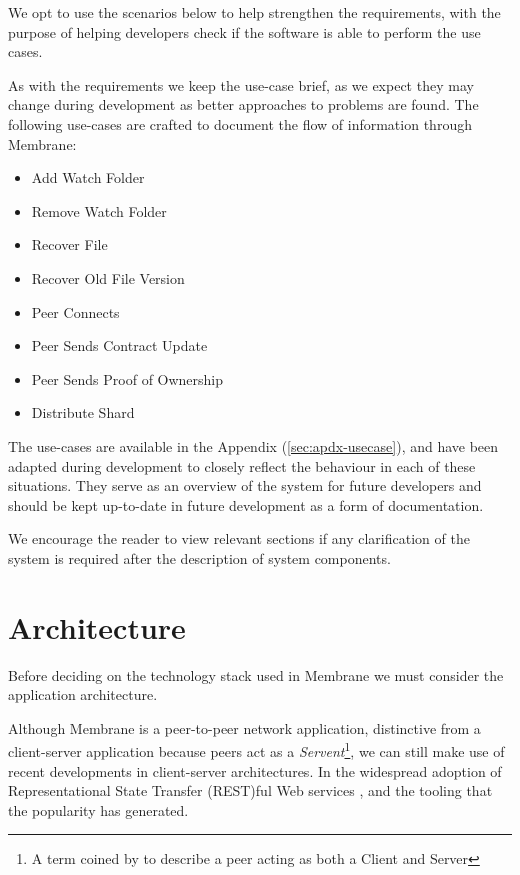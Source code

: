 \documentclass[11pt, a4paper, twoside]{report}
\begin{document}
We opt to use the scenarios below to help strengthen the requirements, with the purpose of helping developers check if the software is able to perform the use cases.

As with the requirements we keep the use-case brief, as we expect they may change during development as better approaches to problems are found. The following use-cases are crafted to document the flow of information through Membrane:

\begin{itemize}
 \item Add Watch Folder
 \item Remove Watch Folder
 \item Recover File
 \item Recover Old File Version
 \item Peer Connects
 \item Peer Sends Contract Update
 \item Peer Sends Proof of Ownership
 \item Distribute Shard
\end{itemize}

The use-cases are available in the Appendix (\ref{sec:apdx-usecase}), and have been adapted during development to closely reflect the behaviour in each of these situations. They serve as an overview of the system for future developers and should be kept up-to-date in future development as a form of documentation.

We encourage the reader to view relevant sections if any clarification of the system is required after the description of system components.

\section{Architecture}

Before deciding on the technology stack used in Membrane we must consider the application architecture.

Although Membrane is a peer-to-peer network application, distinctive from a client-server application because peers act as a \emph{Servent}\footnote{A term coined by \cite{schollmeier2001definition} to describe a peer acting as both a Client and Server},  we can still make use of recent developments in client-server architectures. In the widespread adoption of Representational State Transfer (REST)ful Web services \citep{rodriguez2008restful}, and the tooling that the popularity has generated.
\end{document}
